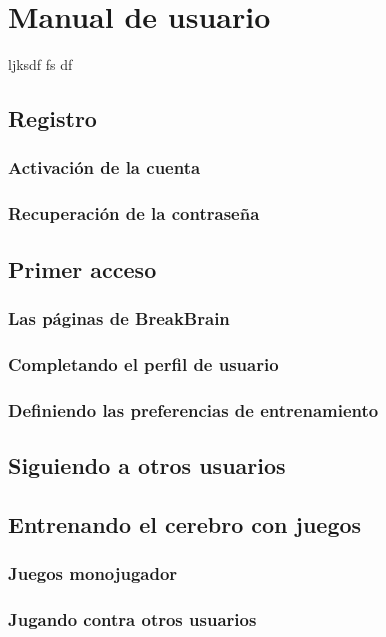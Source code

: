 \chapter{Manual de usuario}
\label{chap::manual}

ljksdf
fs
df

\section{Registro}

\subsection{Activación de la cuenta}

\subsection{Recuperación de la contraseña}

\section{Primer acceso}

\subsection{Las páginas de BreakBrain}

\subsection{Completando el perfil de usuario}

\subsection{Definiendo las preferencias de entrenamiento}

\section{Siguiendo a otros usuarios}

\section{Entrenando el cerebro con juegos}

\subsection{Juegos monojugador}

\subsection{Jugando contra otros usuarios}
